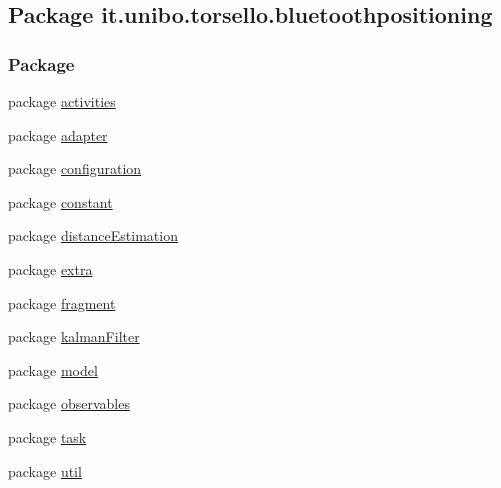 \hypertarget{namespaceit_1_1unibo_1_1torsello_1_1bluetoothpositioning}{}\subsection{Package it.\+unibo.\+torsello.\+bluetoothpositioning}
\label{namespaceit_1_1unibo_1_1torsello_1_1bluetoothpositioning}
\subsubsection*{Package}
\begin{DoxyCompactItemize}
\item 
package \hyperlink{namespaceit_1_1unibo_1_1torsello_1_1bluetoothpositioning_1_1activities}{activities}
\item 
package \hyperlink{namespaceit_1_1unibo_1_1torsello_1_1bluetoothpositioning_1_1adapter}{adapter}
\item 
package \hyperlink{namespaceit_1_1unibo_1_1torsello_1_1bluetoothpositioning_1_1configuration}{configuration}
\item 
package \hyperlink{namespaceit_1_1unibo_1_1torsello_1_1bluetoothpositioning_1_1constant}{constant}
\item 
package \hyperlink{namespaceit_1_1unibo_1_1torsello_1_1bluetoothpositioning_1_1distanceEstimation}{distance\+Estimation}
\item 
package \hyperlink{namespaceit_1_1unibo_1_1torsello_1_1bluetoothpositioning_1_1extra}{extra}
\item 
package \hyperlink{namespaceit_1_1unibo_1_1torsello_1_1bluetoothpositioning_1_1fragment}{fragment}
\item 
package \hyperlink{namespaceit_1_1unibo_1_1torsello_1_1bluetoothpositioning_1_1kalmanFilter}{kalman\+Filter}
\item 
package \hyperlink{namespaceit_1_1unibo_1_1torsello_1_1bluetoothpositioning_1_1model}{model}
\item 
package \hyperlink{namespaceit_1_1unibo_1_1torsello_1_1bluetoothpositioning_1_1observables}{observables}
\item 
package \hyperlink{namespaceit_1_1unibo_1_1torsello_1_1bluetoothpositioning_1_1task}{task}
\item 
package \hyperlink{namespaceit_1_1unibo_1_1torsello_1_1bluetoothpositioning_1_1util}{util}
\end{DoxyCompactItemize}
